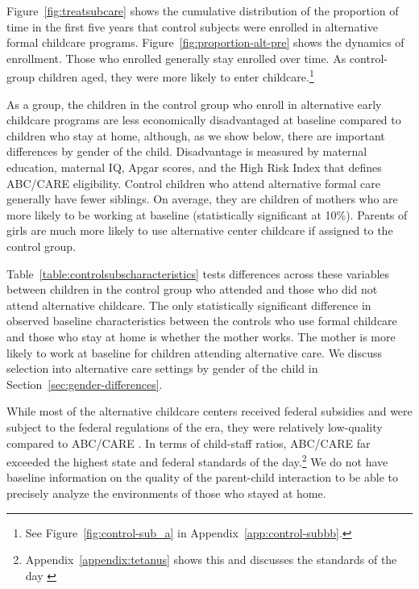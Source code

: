 Figure~\ref{fig:treatsubcare} shows the cumulative distribution of the proportion of time in the first five years that control subjects were enrolled in alternative formal childcare programs. Figure~\ref{fig:proportion-alt-pre} shows the dynamics of enrollment. Those who enrolled generally stay enrolled over time. As control-group children aged, they were more likely to enter childcare.\footnote{See Figure~\ref{fig:control-sub_a} in Appendix~\ref{app:control-subbb}.}

As a group, the children in the control group who enroll in alternative early childcare programs are less economically disadvantaged at baseline compared to children who stay at home, although, as we show below, there are important differences by gender of the child. Disadvantage is measured by maternal education, maternal IQ, Apgar scores, and the High Risk Index that defines ABC/CARE eligibility. Control children who attend alternative formal care generally have fewer siblings. On average, they are children of mothers who are more likely to be working at baseline (statistically significant at 10\%). Parents of girls are much more likely to use alternative center childcare if assigned to the control group.

Table~\ref{table:controlsubscharacteristics} tests differences across these variables between children in the control group who attended and those who did not attend alternative childcare. The only statistically significant difference in observed baseline characteristics between the controls who use formal childcare and those who stay at home is whether the mother works. The mother is more likely to work at baseline for children attending alternative care. We discuss selection into alternative care settings by gender of the child in Section~\ref{sec:gender-differences}.

While most of the alternative childcare centers received federal subsidies and were subject to the federal regulations of the era, they were relatively low-quality compared to ABC/CARE \citep{Burchinal_etal_1989_CD_Daycare-Pre-K-Dev}. In terms of child-staff ratios, ABC/CARE far exceeded the highest state and federal standards of the day.\footnote{Appendix~\ref{appendix:tetanus} shows this and discusses the standards of the day \citep{Department-of-Health_1968_DayCareRequirements,NCGA_1971_House-Bill-100,Ramey-et-al_1977_Intro-to-ABC,Ramey_Campbell_1979_SR,Ramey_McGinness_etal_1982_Abecedarianapproach,Burchinal_Campbell_etal_1997_CD}} We do not have baseline information on the quality of the parent-child interaction to be able to precisely analyze the environments of those who stayed at home.

